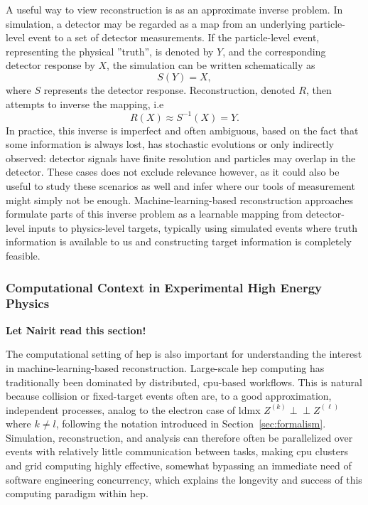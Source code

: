 A useful way to view reconstruction is as an approximate inverse problem. In simulation, a detector may be regarded as a map from an underlying particle-level event to a set of detector measurements. If the particle-level event, representing the physical ''truth'', is denoted by \(Y\), and the corresponding detector response by \(X\), the simulation can be written schematically as
\begin{equation}
    S(Y) = X ,
\end{equation}
where \(S\) represents the detector response. Reconstruction, denoted $R$,  then attempts to inverse the mapping, i.e
\begin{equation}
    R(X) \approx S^{-1}(X) = Y .
\end{equation}
In practice, this inverse is imperfect and often ambiguous, based on the fact that some information is always lost, has stochastic evolutions or only indirectly observed: detector signals have finite resolution and particles may overlap in the detector. These cases does not exclude relevance however, as it could also be useful to study these scenarios as well and infer where our tools of measurement might simply not be enough. Machine-learning-based reconstruction approaches formulate parts of this inverse problem as a learnable mapping from detector-level inputs to physics-level targets, typically using simulated events where truth information is available to us and constructing target information is completely feasible.

\subsubsection{Computational Context in Experimental High Energy Physics}

\textbf{Let Nairit read this section!}

The computational setting of \gls{hep} is also important for understanding the interest in machine-learning-based reconstruction. Large-scale \gls{hep} computing has traditionally been dominated by distributed, \gls{cpu}-based workflows. \cite{sur2026-heterogeneous-computing} This is natural because collision or fixed-target events often are, to a good approximation, independent processes, analog to the electron case of \gls{ldmx} $Z^{(k)} \perp\!\!\!\perp Z^{(\ell)}$ where $k \neq l$, following the notation introduced in Section~\ref{sec:formalism}. Simulation, reconstruction, and analysis can therefore often be parallelized over events with relatively little communication between tasks, making \gls{cpu} clusters and grid computing highly effective, somewhat bypassing an immediate need of software engineering concurrency, which explains the longevity and success of this computing paradigm within \gls{hep}.


